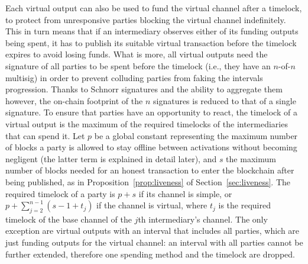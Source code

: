   Each virtual output can also be used to fund the virtual
  channel after a timelock, to protect from unresponsive parties blocking the
  virtual channel indefinitely. This in turn means that if an intermediary
  observes either of its funding outputs being spent, it has to publish its
  suitable virtual transaction before the timelock expires to avoid losing
  funds. What is more, all virtual outputs need the signature of all parties to
  be spent before the timelock (i.e., they have an $n$-of-$n$ multisig) in order
  to prevent colluding parties from faking the intervals progression. Thanks to
  Schnorr signatures and the ability to aggregate
  them~\cite{DBLP:journals/dcc/MaxwellPSW19,DBLP:conf/crypto/NickRS21} however,
  the on-chain footprint of
  the $n$ signatures is reduced to that of a single signature. To ensure
  that parties have an opportunity to react, the timelock of a virtual output is
  the maximum of the required timelocks of the intermediaries that can spend it.
  Let $p$ be a global constant representing the maximum number of blocks a party
  is allowed to stay offline between activations without becoming negligent
  (the latter term is explained in detail later), and
  $s$ the maximum number of blocks needed for an honest transaction to enter the
  blockchain after being published, as in Proposition~\ref{prop:liveness} of
  Section~\ref{sec:liveness}.
  The required timelock of a party is $p + s$ if its channel is simple,  or $p +
  \sum\limits_{j = 2}^{n - 1}(s - 1 + t_j)$ if the channel is virtual, where
  $t_j$ is the required timelock of the base channel
  of the $j$th intermediary's channel. The only exception are virtual outputs
  with an interval that includes all parties, which are just
  funding outputs for the virtual channel: an interval with all parties cannot
  be further extended, therefore one spending method and the timelock are
  dropped.

